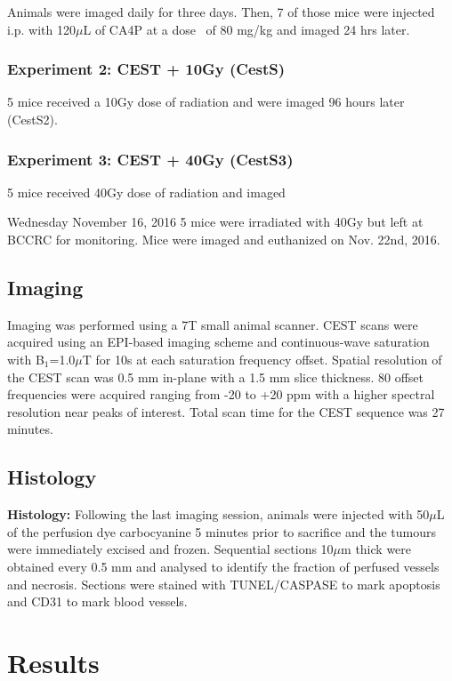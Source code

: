 Animals were imaged daily for three days.
Then, 7 of those mice were injected i.p. with 120$\mu$L of CA4P at a dose~\cite{Maxwell:2002da} of 80 mg/kg and imaged 24 hrs later.


\subsubsection{Experiment 2: CEST + 10Gy (CestS)}

5 mice received a 10Gy dose of radiation and were imaged 96 hours later (CestS2).


\subsubsection{Experiment 3: CEST + 40Gy (CestS3)}

5 mice received 40Gy dose of radiation and imaged 

Wednesday November 16, 2016 5 mice were irradiated with 40Gy but left at BCCRC for monitoring.
Mice were imaged and euthanized on Nov.
22nd, 2016.

\subsection{Imaging}

Imaging was performed using a 7T small animal scanner.
CEST scans were acquired using an EPI-based imaging scheme and continuous-wave saturation with B$_1$=1.0$\mu$T for 10s at each saturation frequency offset.
Spatial resolution of the CEST scan was 0.5 mm in-plane with a 1.5 mm slice thickness.
80 offset frequencies were acquired ranging from -20 to +20 ppm with a higher spectral resolution near peaks of interest.
Total scan time for the CEST sequence was 27 minutes.

\subsection{Histology}

\textbf{Histology:} Following the last imaging session, animals were injected with 50$\mu$L of the perfusion dye carbocyanine 5 minutes prior to sacrifice and the tumours were immediately excised and frozen.
Sequential sections 10$\mu$m thick were obtained every 0.5 mm and analysed to identify the fraction of perfused vessels and necrosis.
Sections were stained with TUNEL/CASPASE to mark apoptosis and CD31 to mark blood vessels.


\section{Results}

